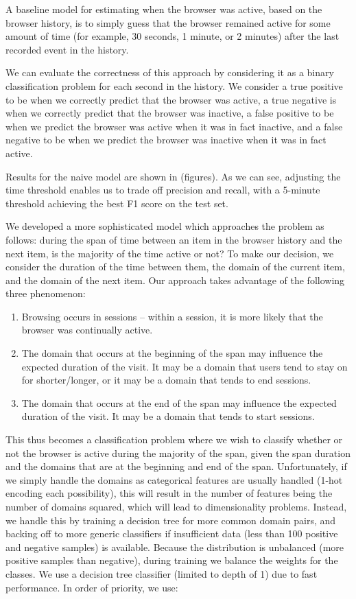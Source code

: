 \documentclass{sigchi}
\begin{document}
A baseline model for estimating when the browser was active, based on the browser history, is to simply guess that the browser remained active for some amount of time (for example, 30 seconds, 1 minute, or 2 minutes) after the last recorded event in the history.

We can evaluate the correctness of this approach by considering it as a binary classification problem for each second in the history. We consider a true positive to be when we correctly predict that the browser was active, a true negative is when we correctly predict that the browser was inactive, a false positive to be when we predict the browser was active when it was in fact inactive, and a false negative to be when we predict the browser was inactive when it was in fact active.

Results for the naive model are shown in (figures). As we can see, adjusting the time threshold enables us to trade off precision and recall, with a 5-minute threshold achieving the best F1 score on the test set.

We developed a more sophisticated model which approaches the problem as follows: during the span of time between an item in the browser history and the next item, is the majority of the time active or not? To make our decision, we consider the duration of the time between them, the domain of the current item, and the domain of the next item. Our approach takes advantage of the following three phenomenon:

\begin{enumerate}
	\item Browsing occurs in sessions -- within a session, it is more likely that the browser was continually active.
	\item The domain that occurs at the beginning of the span may influence the expected duration of the visit. It may be a domain that users tend to stay on for shorter/longer, or it may be a domain that tends to end sessions.
	\item The domain that occurs at the end of the span may influence the expected duration of the visit. It may be a domain that tends to start sessions.
\end{enumerate}

This thus becomes a classification problem where we wish to classify whether or not the browser is active during the majority of the span, given the span duration and the domains that are at the beginning and end of the span. Unfortunately, if we simply handle the domains as categorical features are usually handled (1-hot encoding each possibility), this will result in the number of features being the number of domains squared, which will lead to dimensionality problems. Instead, we handle this by training a decision tree for more common domain pairs, and backing off to more generic classifiers if insufficient data (less than 100 positive and negative samples) is available. Because the distribution is unbalanced (more positive samples than negative), during training we balance the weights for the classes. We use a decision tree classifier (limited to depth of 1) due to fast performance. In order of priority, we use:
\end{document}
